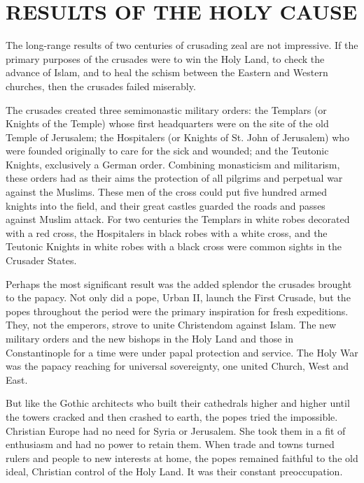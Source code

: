 \section{RESULTS OF THE HOLY CAUSE}

The long-range results of two centuries of crusading zeal are not impressive. If the primary
purposes of the crusades were to win the Holy Land, to check the advance of Islam, and to heal the
schism between the Eastern and Western churches, then the crusades failed miserably.

The crusades created three semimonastic military orders: the Templars (or Knights of the Temple)
whose first headquarters were on the site of the old Temple of Jerusalem; the Hospitalers (or
Knights of St. John of Jerusalem) who were founded originally to care for the sick and wounded; and
the Teutonic Knights, exclusively a German order. Combining monasticism and militarism, these orders
had as their aims the protection of all pilgrims and perpetual war against the Muslims. These men of
the cross could put five hundred armed knights into the field, and their great castles guarded the
roads and passes against Muslim attack. For two centuries the Templars in white robes decorated with
a red cross, the Hospitalers in black robes with a white cross, and the Teutonic Knights in white
robes with a black cross were common sights in the Crusader States.



Perhaps the most significant result was the added splendor the crusades brought to the papacy. Not
only did a pope, Urban II, launch the First Crusade, but the popes throughout the period were the
primary inspiration for fresh expeditions. They, not the emperors, strove to unite Christendom
against Islam. The new military orders and the new bishops in the Holy Land and those in
Constantinople for a time were under papal protection and service. The Holy War was the papacy
reaching for universal sovereignty, one united Church, West and East.

But like the Gothic architects who built their cathedrals higher and higher until the towers cracked
and then crashed to earth, the popes tried the impossible. Christian Europe had no need for Syria or
Jerusalem. She took them in a fit of enthusiasm and had no power to retain them. When trade and
towns turned rulers and people to new interests at home, the popes remained faithful to the old
ideal, Christian control of the Holy Land. It was their constant preoccupation.

